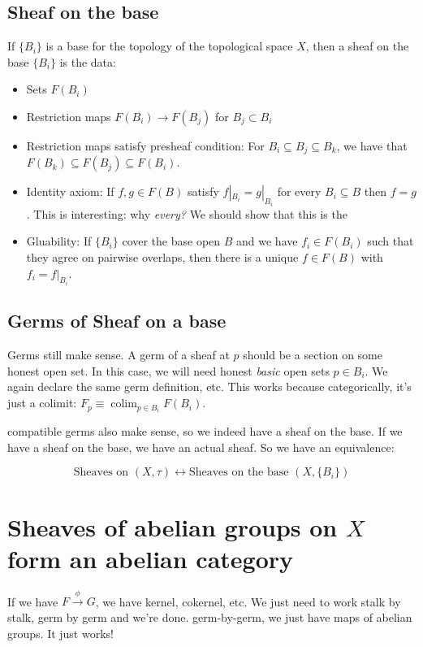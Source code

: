 \documentclass{book}
\newcommand{\colim}{\operatorname{colim}}
\theoremstyle{definition}
\begin{document}
\subsection{Sheaf on the base}
If $\{B_i\}$ is a base for the topology of the topological space $X$, then a
sheaf on the base $\{ B_i \}$ is the data:
\begin{itemize}
    \item Sets $F(B_i)$
    \item Restriction maps $F(B_i) \rightarrow F(B_j)$ for $B_j \subset B_i$
    \item Restriction maps satisfy presheaf condition: For $B_i \subseteq B_j \subseteq B_k$,
        we have that $F(B_k) \subseteq F(B_j) \subseteq F(B_i)$.
    \item Identity axiom: If $f, g \in F(B)$ satisfy $f|_{B_i} = g|_{B_i}$
        for every $B_i \subseteq B$ then $f = g$. This is interesting: why \emph{every?}
        We should show that this is the 
    \item Gluability: If $\{B_i\}$ cover the base open $B$ and we have $f_i \in F(B_i)$
        such that they agree on pairwise overlaps, then there is a unique $f \in F(B)$
        with $f_i = f|_{B_i}$.
\end{itemize}

\subsection{Germs of Sheaf on a base}
Germs still make sense. A germ of a sheaf at $p$
should be a section on some honest open set. In this case, we will need honest \emph{basic} open sets $p \in B_i$.
We again declare the same germ definition, etc. This works because categorically,
it's just a colimit: $F_p \equiv \colim_{p \in B_i} F(B_i)$.

compatible germs also make sense, so we indeed have a sheaf on the base.
If we have a sheaf on the base, we have an actual sheaf. So we have
an equivalence:

$$
\text{Sheaves on $(X, \tau)$} \leftrightarrow  \text{Sheaves on the base $(X, \{ B_i \})$}
$$

\section{Sheaves of abelian groups on $X$ form an abelian category}
If we have $F \xrightarrow{\phi} G$, we have kernel, cokernel, etc. We just
need to work stalk by stalk, germ by germ and we're done. germ-by-germ,
we just have maps of abelian groups. It just works!
\end{document}
